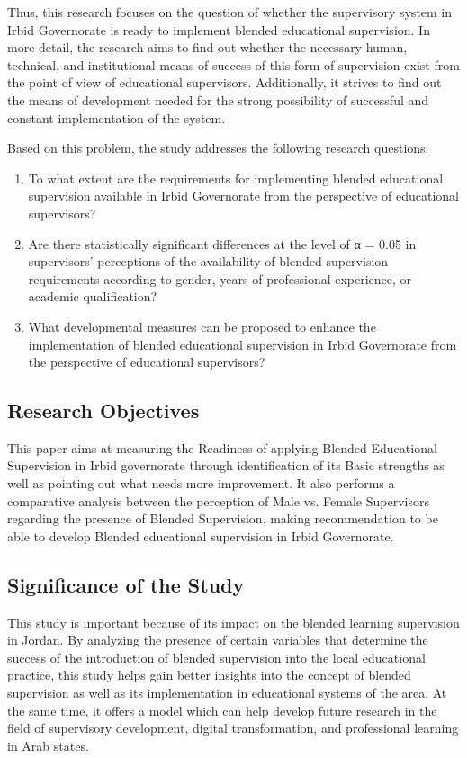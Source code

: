 \documentclass[10pt]{NSP1}
\begin{document}
Thus, this research focuses on the question of whether the supervisory system in Irbid Governorate is ready to implement blended educational supervision. In more detail, the research aims to find out whether the necessary human, technical, and institutional means of success of this form of supervision exist from the point of view of educational supervisors. Additionally, it strives to find out the means of development needed for the strong possibility of successful and constant implementation of the system.

Based on this problem, the study addresses the following research questions:

\begin{enumerate}
\def\labelenumi{\arabic{enumi}.}
\item
  To what extent are the requirements for implementing blended educational supervision available in Irbid Governorate from the perspective of educational supervisors?
\item
  Are there statistically significant differences at the level of α = 0.05 in supervisors' perceptions of the availability of blended supervision requirements according to gender, years of professional experience, or academic qualification?
\item
  What developmental measures can be proposed to enhance the implementation of blended educational supervision in Irbid Governorate from the perspective of educational supervisors?
\end{enumerate}

\subsection{Research Objectives}

This paper aims at measuring the Readiness of applying Blended Educational Supervision in Irbid governorate through identification of its Basic strengths as well as pointing out what needs more improvement. It also performs a comparative analysis between the perception of Male vs. Female Supervisors regarding the presence of Blended Supervision, making recommendation to be able to develop Blended educational supervision in Irbid Governorate.

\subsection{Significance of the Study}

This study is important because of its impact on the blended learning supervision in Jordan. By analyzing the presence of certain variables that determine the success of the introduction of blended supervision into the local educational practice, this study helps gain better insights into the concept of blended supervision as well as its implementation in educational systems of the area. At the same time, it offers a model which can help develop future research in the field of supervisory development, digital transformation, and professional learning in Arab states.
\end{document}
